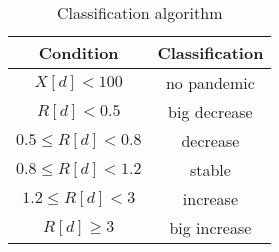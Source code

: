 \begin{table}[ht]
\centering
\begin{tabular}{|c|c|}
\hline
\textbf{Condition} & \textbf{Classification} \\
\hline
$X[d] < 100$ & no pandemic \\
\hline
$R[d] < 0.5$ & big decrease \\
\hline
$0.5 \leq R[d] < 0.8$ & decrease \\
\hline
$0.8 \leq R[d] < 1.2$ & stable \\
\hline
$1.2 \leq R[d] < 3$ & increase \\
\hline
$R[d] \geq 3$ & big increase \\
\hline
\end{tabular}
\caption{Classification algorithm}
\label{tab:classification}
\end{table}